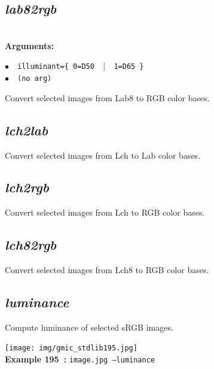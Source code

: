 \documentclass[a4paper,10.5pt,twoside]{book}
\newcommand{\Cb}[1]{\textcolor{cb}{#1}}
\begin{document}
\subsection{\emph{lab82rgb} }\vspace*{-0.7em}
~\\\textbf{\Cb{Arguments: }}\begin{flushleft}
{\small \Cb{\hspace*{0.5cm}$\bullet$~~\texttt{illuminant=\{ 0=D50 ~$|$~ 1=D65 \}}}}~~~\\
{\small \Cb{\hspace*{0.5cm}$\bullet$~~\texttt{(no arg)}}}\end{flushleft}
Convert selected images from Lab8 to RGB color bases.


\subsection{\emph{lch2lab} }\vspace*{-0.7em}
Convert selected images from Lch to Lab color bases.


\subsection{\emph{lch2rgb} }\vspace*{-0.7em}
Convert selected images from Lch to RGB color bases.


\subsection{\emph{lch82rgb} }\vspace*{-0.7em}
Convert selected images from Lch8 to RGB color bases.


\subsection{\emph{luminance} }\vspace*{-0.7em}
Compute luminance of selected sRGB images.
\begin{center}\texttt{[image: img/gmic\_stdlib195.jpg]}\\
{\footnotesize \textbf{Example 195~:} \texttt{image.jpg --luminance}}
\end{center}
\end{document}
